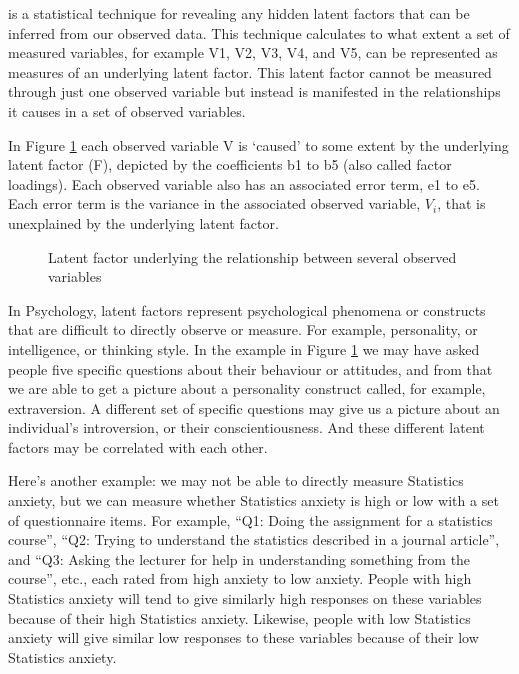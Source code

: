  is a statistical technique for revealing any hidden latent factors that can be inferred from our observed data. This technique calculates to what extent a set of measured variables, for example V1, V2, V3, V4, and V5, can be represented as measures of an underlying latent factor. This latent factor cannot be measured through just one observed variable but instead is manifested in the relationships it causes in a set of observed variables. 

In Figure \ref{fig:fa1} each observed variable V is `caused’ to some extent by the underlying latent factor (F), depicted by the coefficients b1 to b5 (also called factor loadings). Each observed variable also has an associated error term, e1 to e5. Each error term is the variance in the associated observed variable, $V_i$, that is unexplained by the underlying latent factor.

\begin{figure}[!htb]
\begin{center}
\caption{Latent factor underlying the relationship between several observed variables}
\label{fig:fa1}
\HR
\end{center}
\end{figure}

In Psychology, latent factors represent psychological phenomena or constructs that are difficult to directly observe or measure. For example, personality, or intelligence, or thinking style. In the example in Figure \ref{fig:fa1} we may have asked people five specific questions about their behaviour or attitudes, and from that we are able to get a picture about a personality construct called, for example, extraversion. A different set of specific questions may give us a picture about an individual’s introversion, or their conscientiousness. And these different latent factors may be correlated with each other.

Here’s another example: we may not be able to directly measure Statistics anxiety, but we can measure whether Statistics anxiety is high or low with a set of questionnaire items. For example, “Q1: Doing the assignment for a statistics course”, “Q2: Trying to understand the statistics described in a journal article”, and “Q3: Asking the lecturer for help in understanding something from the course”, etc., each rated from high anxiety to low anxiety. People with high Statistics anxiety will tend to give similarly high responses on these variables because of their high Statistics anxiety. Likewise, people with low Statistics anxiety will give similar low responses to these variables because of their low Statistics anxiety. 


